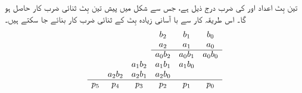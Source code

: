 تین بِٹ   اعداد  اور   کی  ضرب درج ذیل ہے، جس سے شکل  میں پیش تین بِٹ ثنائی  ضرب کار  حاصل ہو گا۔ اس طریقہ  کار سے با آسانی زیادہ بِٹ کے ثنائی ضرب کار بنائے جا سکتے ہیں۔
\begin{gather}
\begin{aligned}\label{مساوات_ترکیبی_تین_بٹ_ضرب_کار}
\begin{array}{cccccc}
&&&b_2& b_1&b_0\\
&&&a_2& a_1&a_0\\
\cline{4-6}
&&&a_0b_2& a_0b_1&a_0b_0\\
&&a_1b_2&a_1b_1&a_1b_0&\\
&a_2b_2&a_2b_1&a_2b_0&\\
\cline{1-6}
p_5&p_4&p_3&p_2&p_1&p_0
\end{array}
\end{aligned}
\end{gather}
%
